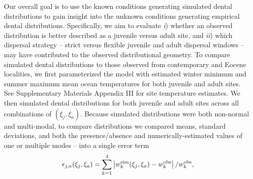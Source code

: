 \documentclass[]{rsos}%
\begin{document}
Our overall goal is to use the known conditions generating simulated dental distributions to gain insight into the unknown conditions generating empirical dental distributions.
Specifically, we aim to evaluate \emph{i}) whether an observed distribution is better described as a juvenile versus adult site, and \emph{ii}) which dispersal strategy -- strict versus flexible juvenile and adult dispersal windows -- may have contributed to the observed distributional geometry. 
To compare simulated dental distributions to those observed from contemporary and Eocene localities, we first parameterized the model with estimated winter minimum and summer maximum mean ocean temperatures for both juvenile and adult sites.
See Supplementary Materials Appendix III for site temperature estimates.
We then simulated dental distributions for both juvenile and adult sites across all combinations of $(\xi_j,\xi_a)$.
Because simulated distributions were both non-normal and multi-modal, to compare distributions we compared means, standard deviations, and both the presence/absence and numerically-estimated values of one or multiple modes -- into a single error term
\begin{equation}
\epsilon_{j,a}(\xi_j,\xi_a) = \sum_{k=1}^4 \left| w^{\rm sim}_k(\xi_j,\xi_a) - w^{\rm obs}_k \right|/w^{\rm obs}_k,
\label{eq:error}
\end{equation}
\end{document}

